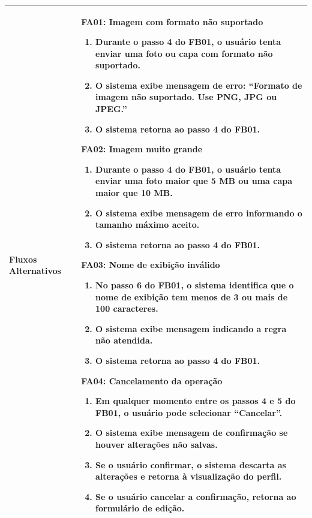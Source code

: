 \begin{longtable}{ >{\raggedright}p{2.8cm} | >{\raggedright\arraybackslash}p{10.7cm} }
Fluxos Alternativos & \mbox{}
\textbf{FA01:} Imagem com formato não suportado
\vspace{2pt}
\begin{enumerate}[nosep,leftmargin=1.2em,topsep=0pt,partopsep=0pt,parsep=0pt,itemsep=0pt,after=\vspace{2pt}]
	\item Durante o passo 4 do FB01, o usuário tenta enviar uma foto ou capa com formato não suportado.
	\item O sistema exibe mensagem de erro: ``Formato de imagem não suportado. Use PNG, JPG ou JPEG.''
	\item O sistema retorna ao passo 4 do FB01.
\end{enumerate}

\textbf{FA02:} Imagem muito grande
\vspace{2pt}
\begin{enumerate}[nosep,leftmargin=1.2em,topsep=0pt,partopsep=0pt,parsep=0pt,itemsep=0pt,after=\vspace{2pt}]
	\item Durante o passo 4 do FB01, o usuário tenta enviar uma foto maior que 5 MB ou uma capa maior que 10 MB.
	\item O sistema exibe mensagem de erro informando o tamanho máximo aceito.
	\item O sistema retorna ao passo 4 do FB01.
\end{enumerate}

\textbf{FA03:} Nome de exibição inválido
\vspace{2pt}
\begin{enumerate}[nosep,leftmargin=1.2em,topsep=0pt,partopsep=0pt,parsep=0pt,itemsep=0pt,after=\vspace{2pt}]
	\item No passo 6 do FB01, o sistema identifica que o nome de exibição tem menos de 3 ou mais de 100 caracteres.
	\item O sistema exibe mensagem indicando a regra não atendida.
	\item O sistema retorna ao passo 4 do FB01.
\end{enumerate}

\textbf{FA04:} Cancelamento da operação
\vspace{2pt}
\begin{enumerate}[nosep,leftmargin=1.2em,topsep=0pt,partopsep=0pt,parsep=0pt,itemsep=0pt,after=\vspace{2pt}]
	\item Em qualquer momento entre os passos 4 e 5 do FB01, o usuário pode selecionar ``Cancelar''.
	\item O sistema exibe mensagem de confirmação se houver alterações não salvas.
	\item Se o usuário confirmar, o sistema descarta as alterações e retorna à visualização do perfil.
	\item Se o usuário cancelar a confirmação, retorna ao formulário de edição.
\end{enumerate}
\mbox{} \\ \hline


\end{longtable}

